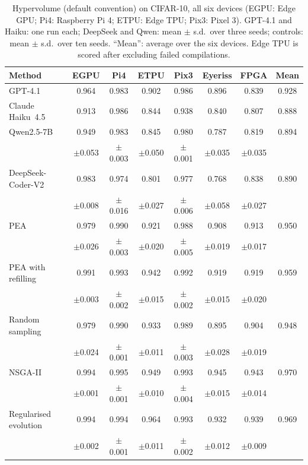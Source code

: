 \documentclass[pdflatex,sn-mathphys-num]{sn-jnl}
\begin{document}
\begin{table}[h]\centering\footnotesize
\caption{Hypervolume (default convention) on CIFAR-10, all six devices (EGPU: Edge GPU; Pi4: Raspberry Pi 4; ETPU: Edge TPU; Pix3: Pixel 3). GPT-4.1 and Haiku: one run each; DeepSeek and Qwen: mean $\pm$ s.d.\ over three seeds; controls: mean $\pm$ s.d.\ over ten seeds. ``Mean'': average over the six devices. Edge TPU is scored after excluding failed compilations.}\label{tab:multidevice}
\setlength{\tabcolsep}{2pt}
\begin{tabular}{lccccccc}
\toprule
Method & EGPU & Pi4 & ETPU & Pix3 & Eyeriss & FPGA & Mean \\
\midrule
GPT-4.1 & 0.964 & 0.983 & 0.902 & 0.986 & 0.896 & 0.839 & 0.928 \\
Claude Haiku~4.5 & 0.913 & 0.986 & 0.844 & 0.938 & 0.840 & 0.807 & 0.888 \\
Qwen2.5-7B & 0.949 & 0.983 & 0.845 & 0.980 & 0.787 & 0.819 & 0.894 \\
 & $\pm$0.053 & $\pm$0.003 & $\pm$0.050 & $\pm$0.001 & $\pm$0.035 & $\pm$0.035 &  \\
DeepSeek-Coder-V2 & 0.983 & 0.974 & 0.801 & 0.977 & 0.768 & 0.838 & 0.890 \\
 & $\pm$0.008 & $\pm$0.016 & $\pm$0.027 & $\pm$0.006 & $\pm$0.058 & $\pm$0.027 &  \\
\midrule
PEA & 0.979 & 0.990 & 0.921 & 0.988 & 0.908 & 0.913 & 0.950 \\
 & $\pm$0.026 & $\pm$0.003 & $\pm$0.020 & $\pm$0.005 & $\pm$0.019 & $\pm$0.017 &  \\
PEA with refilling & 0.991 & 0.993 & 0.942 & 0.992 & 0.919 & 0.919 & 0.959 \\
 & $\pm$0.003 & $\pm$0.002 & $\pm$0.015 & $\pm$0.002 & $\pm$0.015 & $\pm$0.020 &  \\
Random sampling & 0.979 & 0.990 & 0.933 & 0.989 & 0.895 & 0.904 & 0.948 \\
 & $\pm$0.024 & $\pm$0.001 & $\pm$0.011 & $\pm$0.003 & $\pm$0.028 & $\pm$0.019 &  \\
NSGA-II & 0.994 & 0.995 & 0.949 & 0.993 & 0.945 & 0.943 & 0.970 \\
 & $\pm$0.001 & $\pm$0.001 & $\pm$0.010 & $\pm$0.004 & $\pm$0.015 & $\pm$0.014 &  \\
Regularised evolution & 0.994 & 0.994 & 0.964 & 0.993 & 0.932 & 0.939 & 0.969 \\
 & $\pm$0.002 & $\pm$0.001 & $\pm$0.011 & $\pm$0.002 & $\pm$0.012 & $\pm$0.009 &  \\
\bottomrule
\end{tabular}
\end{table}
\end{document}
